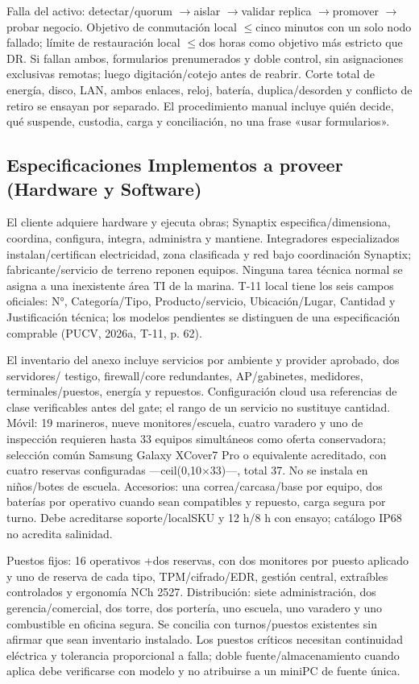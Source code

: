 \documentclass[11pt,letterpaper]{report}
\begin{document}
Falla del activo: detectar/quorum $\rightarrow$aislar $\rightarrow$validar replica $\rightarrow$promover $\rightarrow$probar negocio. Objetivo de conmutación local $\leq$cinco minutos con un solo nodo fallado; límite de restauración local $\leq$dos horas como objetivo más estricto que DR. Si fallan ambos, formularios prenumerados y doble control, sin asignaciones exclusivas remotas; luego digitación/cotejo antes de reabrir. Corte total de energía, disco, LAN, ambos enlaces, reloj, batería, duplica/desorden y conflicto de retiro se ensayan por separado. El procedimiento manual incluye quién decide, qué suspende, custodia, carga y conciliación, no una frase «usar formularios».

\subsection{Especificaciones Implementos a proveer (Hardware y Software)}
El cliente adquiere hardware y ejecuta obras; Synaptix especifica/dimensiona, coordina, configura, integra, administra y mantiene. Integradores especializados instalan/certifican electricidad, zona clasificada y red bajo coordinación Synaptix; fabricante/servicio de terreno reponen equipos. Ninguna tarea técnica normal se asigna a una inexistente área TI de la marina. T-11 local tiene los seis campos oficiales: N°, Categoría/Tipo, Producto/servicio, Ubicación/Lugar, Cantidad y Justificación técnica; los modelos pendientes se distinguen de una especificación comprable (PUCV, 2026a, T-11, p. 62).

El inventario del anexo incluye servicios por ambiente y provider aprobado, dos servidores/ testigo, firewall/core redundantes, AP/gabinetes, medidores, terminales/puestos, energía y repuestos. Configuración cloud usa referencias de clase verificables antes del gate; el rango de un servicio no sustituye cantidad. Móvil: 19 marineros, nueve monitores/escuela, cuatro varadero y uno de inspección requieren hasta 33 equipos simultáneos como oferta conservadora; selección común Samsung Galaxy XCover7 Pro o equivalente acreditado, con cuatro reservas configuradas ---ceil(0,10$\times$33)---, total 37. No se instala en niños/botes de escuela. Accesorios: una correa/carcasa/base por equipo, dos baterías por operativo cuando sean compatibles y repuesto, carga segura por turno. Debe acreditarse soporte/localSKU y 12 h/8 h con ensayo; catálogo IP68 no acredita salinidad.

Puestos fijos: 16 operativos +dos reservas, con dos monitores por puesto aplicado y uno de reserva de cada tipo, TPM/cifrado/EDR, gestión central, extraíbles controlados y ergonomía NCh 2527. Distribución: siete administración, dos gerencia/comercial, dos torre, dos portería, uno escuela, uno varadero y uno combustible en oficina segura. Se concilia con turnos/puestos existentes sin afirmar que sean inventario instalado. Los puestos críticos necesitan continuidad eléctrica y tolerancia proporcional a falla; doble fuente/almacenamiento cuando aplica debe verificarse con modelo y no atribuirse a un miniPC de fuente única.
\end{document}
